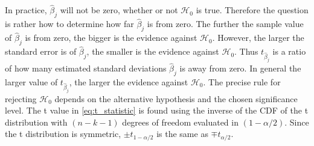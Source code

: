In practice, $\hat{\beta}_j$ will not be zero, whether or not $\mathcal{H}_0$ is true.
Therefore the question is rather how to determine how far $\hat{\beta}_j$ is from zero. 
The further the sample value of $\hat{\beta}_j$ is from zero, the bigger is the evidence against $\mathcal{H}_0$. 
However, the larger the standard error is of $\hat{\beta}_j$, the smaller is the evidence against $\mathcal{H}_0$. 
Thus $t_{\hat{\beta}_j}$ is a ratio of how many estimated standard deviations $\hat{\beta}_j$ is away from zero.
In general the larger value of $t_{\hat{\beta}_j}$, the larger the evidence against $\mathcal{H}_0$. 
The precise rule for rejecting $\mathcal{H}_0$ depends on the alternative hypothesis and the chosen significance level.
The t value in \eqref{eq:t_statistic} is found using the inverse of the CDF of the t distribution with $(n - k - 1)$ degrees of freedom evaluated in $(1-\alpha/2)$. 
Since the t distribution is symmetric, $\pm t_{1-\alpha/2}$ is the same as $\mp t_{\alpha/2}$.

